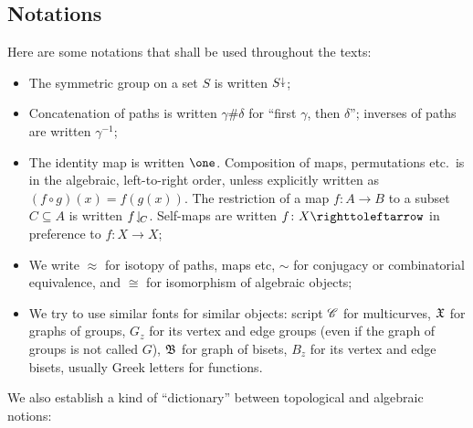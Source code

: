 \documentclass{amsart}
\begin{document}
\subsection{Notations}
Here are some notations that shall be used throughout the texts:
\begin{itemize}
\item The symmetric group on a set $S$ is written $S{\stackrel{\downarrow}{\smash.}}$;
\item Concatenation of paths is written $\gamma\#\delta$ for ``first
  $\gamma$, then $\delta$''; inverses of paths are written $\gamma^{-1}$;
\item The identity map is written $\one$. Composition of maps,
  permutations etc.\ is in the algebraic, left-to-right order, unless
  explicitly written as $(f\circ g)(x)=f(g(x))$. The restriction of a
  map $f\colon A\to B$ to a subset $C\subseteq A$ is written
  $f\!\downharpoonleft_{\!C}$. Self-maps are written $f\colon X\selfmap$ in
  preference to $f\colon X\to X$;
\item We write $\approx$ for isotopy of paths, maps etc, $\sim$ for
  conjugacy or combinatorial equivalence, and $\cong$ for isomorphism
  of algebraic objects;
\item We try to use similar fonts for similar objects: script ${\mathscr C}$
  for multicurves, ${\mathfrak X}$ for graphs of groups, $G_z$ for its vertex
  and edge groups (even if the graph of groups is not called $G$),
  ${\mathfrak B}$ for graph of bisets, $B_z$ for its vertex and edge
  bisets, usually Greek letters for functions.
\end{itemize}

We also establish a kind of ``dictionary'' between topological and
algebraic notions:
\end{document}

